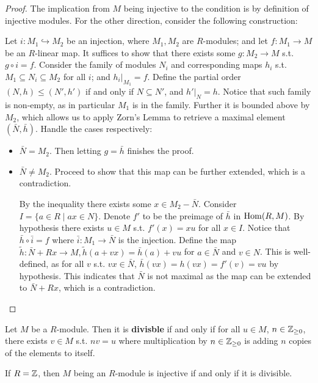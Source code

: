 \documentclass{article}
\begin{document}
\begin{proof}
    The implication from $M$ being injective to the condition is by definition of injective modules. For the other direction, consider the following construction:

    Let $i: M_1 \hookrightarrow M_2$ be an injection, where $M_1, M_2$ are $R$-modules; and let $f: M_1 \to M$ be an $R$-linear map. It suffices to show that there exists some $g: M_2 \to M$ s.t. $g \circ i = f$. Consider the family of modules $N_i$ and corresponding maps $h_i$ s.t. $M_1 \subseteq N_i \subseteq M_2$ for all $i$; and $h_i|_{M_1} = f$. Define the partial order $(N, h) \leq (N', h')$ if and only if $N \subseteq N'$, and $h'|_N = h$. Notice that such family is non-empty, as in particular $M_1$ is in the family. Further it is bounded above by $M_2$, which allows us to apply Zorn's Lemma to retrieve a maximal element $(\bar{N}, \bar{h})$. Handle the cases respectively:
    \begin{itemize}
        \item $\bar{N} = M_2$. Then letting $g = \bar{h}$ finishes the proof.
        \item $\bar{N} \neq M_2$. Proceed to show that this map can be further extended, which is a contradiction.
        
        By the inequality there exists some $x \in M_2 - \bar{N}$. Consider $I = \{a \in R \mid ax \in N\}$. Denote $f'$ to be the preimage of $\bar{h}$ in $\mathrm{Hom}(R, M)$. By hypothesis there exists $u\in M$ s.t. $f'(x) = xu$ for all $x \in I$. Notice that $\bar{h} \circ \bar{i} = f$ where $\bar{i}: M_1 \to \bar{N}$ is the injection. Define the map $\tilde{h}: \bar{N} + Rx \to M , \tilde{h}(a + vx) = \bar{h}(a) + vu$ for $a \in \bar{N}$ and $v\in N$. This is well-defined, as for all $v$ s.t. $vx \in \bar{N}$, $\bar{h}(vx) = h(vx) = f'(v) = vu$ by hypothesis. This indicates that $\bar{N}$ is not maximal as the map can be extended to $\bar{N} + Rx$, which is a contradiction.
    \end{itemize}
\end{proof}

\begin{definition}
    Let $M$ be a $R$-module. Then it is \textbf{divisble} if and only if for all $u \in M$, $n \in \mathbb{Z}_{\geq 0}$, there exists $v \in M$ s.t. $nv = u$ where multiplication by $n \in \mathbb{Z}_{\geq 0}$ is adding $n$ copies of the elements to itself.
\end{definition}

\begin{corollary}
    If $R = \mathbb{Z}$, then $M$ being an $R$-module is injective if and only if it is divisible.
\end{corollary}
\end{document}
